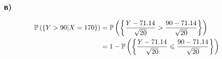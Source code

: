 \documentclass{article}
\begin{document}
\subsubsection*{в)}

\begin{equation*}
    \begin{aligned}
        \mathbb{P}\left(\{Y>90|X=170\}\right)&=\mathbb{P}\left(\left\{\frac{Y-71.14}{\sqrt{20}}>\frac{90-71.14}{\sqrt{20}}\right\}\right)\\
        &=1-\mathbb{P}\left(\left\{\frac{Y-71.14}{\sqrt{20}}\leqslant\frac{90-71.14}{\sqrt{20}}\right\}\right)
    \end{aligned}
\end{equation*}



\end{document}
